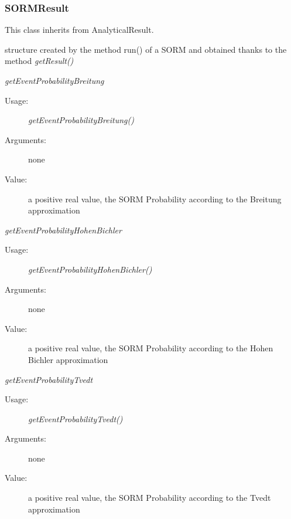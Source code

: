 \newpage
\subsubsection{SORMResult}

This class inherits from AnalyticalResult.

\begin{description}

\item[Usage:] structure created by the method run() of a SORM and obtained thanks to the method \textit{getResult()}

\item[Some methods :]  \rule{0pt}{1em}

\begin{description}

\item \textit{getEventProbabilityBreitung}
\begin{description}
\item[Usage:] \textit{getEventProbabilityBreitung()}
\item[Arguments:] none
\item[Value:]  a positive real value, the SORM Probability according to the Breitung approximation
\end{description}
\bigskip

\item \textit{getEventProbabilityHohenBichler}
\begin{description}
\item[Usage:] \textit{getEventProbabilityHohenBichler()}
\item[Arguments:] none
\item[Value:]  a positive real value, the SORM Probability according to the Hohen Bichler approximation
\end{description}
\bigskip

\item \textit{getEventProbabilityTvedt}
\begin{description}
\item[Usage:] \textit{getEventProbabilityTvedt()}
\item[Arguments:] none
\item[Value:]  a positive real value, the SORM Probability according to the Tvedt approximation
\end{description}
\bigskip


\end{description}
\end{description}
